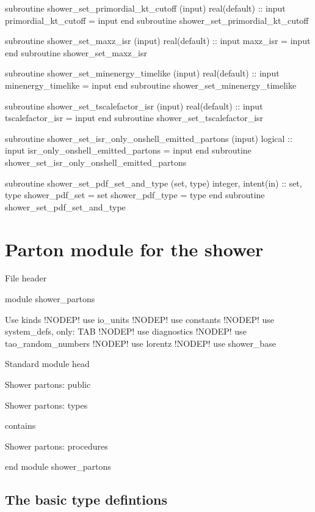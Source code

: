   subroutine shower_set_primordial_kt_cutoff (input)
    real(default) :: input
    primordial_kt_cutoff = input
  end subroutine shower_set_primordial_kt_cutoff

  subroutine shower_set_maxz_isr (input)
    real(default) :: input
    maxz_isr = input
  end subroutine shower_set_maxz_isr

  subroutine shower_set_minenergy_timelike (input)
    real(default) :: input
    minenergy_timelike = input
  end subroutine shower_set_minenergy_timelike

  subroutine shower_set_tscalefactor_isr (input)
    real(default) :: input
    tscalefactor_isr = input
  end subroutine shower_set_tscalefactor_isr

  subroutine shower_set_isr_only_onshell_emitted_partons (input)
    logical :: input
    isr_only_onshell_emitted_partons = input
  end subroutine shower_set_isr_only_onshell_emitted_partons

  subroutine shower_set_pdf_set_and_type (set, type)
    integer, intent(in) :: set, type
    shower_pdf_set = set
    shower_pdf_type = type
  end subroutine shower_set_pdf_set_and_type

\eatline
\eatline
\eatline
\eatline
\eatline
\eatline
\eatline
\eatline
\eatline
\eatline
\eatline
\eatline
\eatline
\nwendcode{}\nwdocspar
\section{Parton module for the shower}
\nwenddocs{}\endmoddef
\LA{}File header\RA{}

module shower_partons

\LA{}Use kinds\RA{} !NODEP!
  use io_units !NODEP!
  use constants !NODEP!
  use system_defs, only: TAB !NODEP!
  use diagnostics !NODEP!
  use tao_random_numbers !NODEP!
  use lorentz !NODEP!
  use shower_base

\LA{}Standard module head\RA{}

\LA{}Shower partons: public\RA{}

\LA{}Shower partons: types\RA{}

contains

\LA{}Shower partons: procedures\RA{}

end module shower_partons
\eatline
\nwendcode{}\nwdocspar
\subsection{The basic type defintions}

